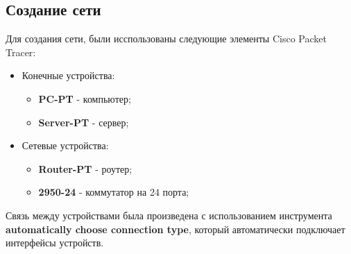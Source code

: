 \subsection{Создание сети}
Для создания сети, были исспользованы следующие элементы Cisco Packet Tracer:
\begin{itemize}
\item Конечные устройства:
\begin{itemize}
\item \textbf{PC-PT} - компьютер;
\item \textbf{Server-PT} - сервер;
\end{itemize}
\item Сетевые устройства:
\begin{itemize}
\item \textbf{Router-PT} - роутер;
\item \textbf{2950-24} - коммутатор на 24 порта;
\end{itemize}
\end{itemize}
Связь между устройствами была произведена с использованием инструмента \textbf{automatically choose connection type}, который автоматически подключает интерфейсы устройств.

